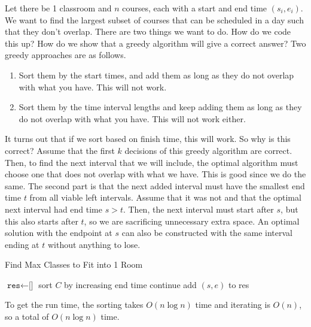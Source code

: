 \documentclass{article}
\begin{document}
    \begin{example}
      Let there be 1 classroom and $n$ courses, each with a start and end time $(s_i, e_i)$. We want to find the largest subset of courses that can be scheduled in a day such that they don't overlap. There are two things we want to do. How do we code this up? How do we show that a greedy algorithm will give a correct answer? Two greedy approaches are as follows. 
      \begin{enumerate}
        \item Sort them by the start times, and add them as long as they do not overlap with what you have. This will not work. 
        \item Sort them by the time interval lengths and keep adding them as long as they do not overlap with what you have. This will not work either. 
      \end{enumerate}
      It turns out that if we sort based on finish time, this will work. So why is this correct? Assume that the first $k$ decisions of this greedy algorithm are correct. Then, to find the next interval that we will include, the optimal algorithm must choose one that does not overlap with what we have. This is good since we do the same. The second part is that the next added interval must have the smallest end time $t$ from all viable left intervals. Assume that it was not and that the optimal next interval had end time $s > t$. Then, the next interval must start after $s$, but this also starts after $t$, so we are sacrificing unnecessary extra space. An optimal solution with the endpoint at $s$ can also be constructed with the same interval ending at $t$ without anything to lose. 

      \begin{algorithm}[H]
        \caption{Find Max Classes to Fit into 1 Room}
        \label{alg:class1}
        \begin{algorithmic}
            \State $\texttt{res} \gets \texttt{[]}$ 
            \State sort $C$ by increasing end time
               
                \State continue
              \EndIf
              \State add $(s, e)$ to res 
            \EndFor
            \State {}
          \EndFunction
        \end{algorithmic}
      \end{algorithm}
      To get the run time, the sorting takes $O(n \log{n})$ time and iterating is $O(n)$, so a total of $O(n \log{n})$ time. 
    \end{example}
\end{document}
